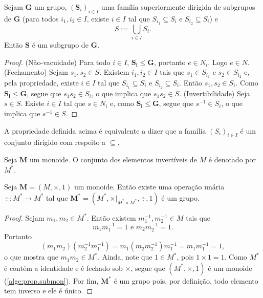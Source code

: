 \begin{proposition}
\label{alge:prop.subgru.uni}
Sejam $\bm G$ um grupo, $(\bm S_i)_{i \in I}$ uma família superiormente dirigida de subgrupos de $\bm G$ (para todos $i_1,i_2 \in I$, existe $i \in I$ tal que $S_{i_1} \subseteq S_i$ e $S_{i_2} \subseteq S_i$) e
	\begin{equation*}
	S := \bigcup_{i \in I} S_i.
	\end{equation*}
Então $\bm S$ é um subgrupo de $\bm G$.
\end{proposition}
\begin{proof}
(Não-vacuidade) Para todo $i \in I$, $\bm{S_i}\leq \bm G$, portanto $e \in N_i$. Logo $e \in N$. (Fechamento) Sejam $s_1,s_2 \in S$. Existem $i_1,i_2 \in I$ tais que $s_1 \in S_{i_1}$ e $s_2 \in S_{i_2}$ e, pela propriedade, existe $i \in I$ tal que $S_{i_1} \subseteq S_{i} \text{\ \ e\ \ } S_{i_2} \subseteq S_{i}$. Então $s_1,s_2 \in S_i$. Como $\bm{S_i} \leq \bm G$, segue que $s_1s_2 \in S_i$, o que implica que $s_1s_2 \in S$. (Invertibilidade) Seja $s \in S$. Existe $i \in I$ tal que $s \in N_i$ e, como $\bm{S_i} \leq \bm G$, segue que $s^{-1} \in S_i$, o que implica que $s^{-1} \in S$.
\end{proof}

A propriedade definida acima é equivalente a dizer que a família $(S_i)_{i \in I}$ é um conjunto dirigido com respeito a $\subseteq$.

\begin{definition}
	Seja $\bm M$ um monoide. O conjunto dos elementos invertíveis de $M$ é denotado por $M^*$.
\end{definition}


\begin{proposition}
Seja $\bm M = (M,\times,1)$ um monoide. Então existe uma operação unária $\div \colon M^* \to M^*$ tal que $\bm{M^*}=(M^*,\times|_{M^* \times M^*},\div,1)$ é um grupo.
\end{proposition}
\begin{proof}
	Sejam $m_1,m_2 \in M^*$. Então existem $m_1^{-1},m_2^{-1} \in M$ tais que
	\begin{equation*}
	m_1m_1^{-1}=1 \text{\ \ e\ \ } m_2m_2^{-1}=1.
	\end{equation*}
Portanto
	\begin{equation*}
	(m_1m_2)(m_2^{-1}m_1^{-1}) = m_1(m_2m_2^{-1})m_1^{-1} = m_1m_1^{-1} = 1,
	\end{equation*}
o que mostra que $m_1m_2 \in M^*$. Ainda, note que $1 \in M^*$, pois $1 \times 1 = 1$. Como $M^*$ é contém a identidade e é fechado sob $\times$, segue que $(M^*,\times,1)$ é um monoide (\ref{alge:prop.submon}). Por fim, $\bm{M^*}$ é um grupo pois, por definição, todo elemento tem inverso e ele é único.
\end{proof}

